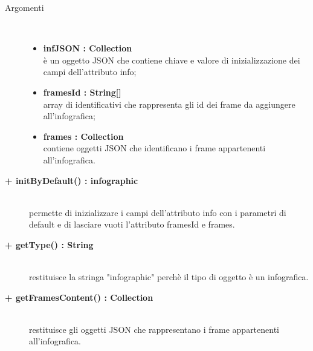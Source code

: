 \begin{description}
\begin{description}
		\begin{description}
			\item[Argomenti] \hfill \\
				\begin{itemize}
				
					\item \textbf{infJSON : Collection			} \hfill \\
					è un oggetto JSON che contiene chiave e valore di inizializzazione dei campi dell'attributo info;
					\item \textbf{framesId : String[]			} \hfill \\
					array di identificativi che rappresenta gli id dei frame da aggiungere all'infografica;
					\item \textbf{frames : Collection			} \hfill \\
					contiene oggetti JSON che identificano i frame appartenenti all'infografica. 
				\end{itemize}
		\end{description}

\end{description}

\begin{description}
		\item[\textbf{\color{blue}+ initByDefault() : infographic			}] \hfill \\
			permette di inizializzare i campi dell'attributo info con i parametri di default e di lasciare vuoti l'attributo framesId e frames. 

\end{description}

\begin{description}
		\item[\textbf{\color{blue}+ getType() : String			}] \hfill \\
			restituisce la stringa "infographic" perchè il tipo di oggetto è un infografica.

\end{description}

\begin{description}
		\item[\textbf{\color{blue}+ getFramesContent() : Collection			}] \hfill \\
			restituisce gli oggetti JSON che rappresentano i frame appartenenti all'infografica.

\end{description}


\end{description}
